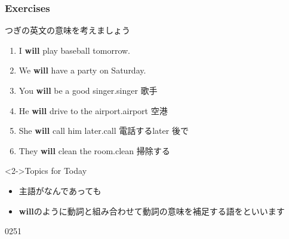 \documentclass[aspectratio=169,xcolor={dvipsnames,table}]{beamer}
\newcommand{\myaudio}[1]{\href{#1}{\faVolumeUp}}
\begin{document}
\begin{frame}[plain]\frametitle{Exercises}

{\small つぎの英文の意味を考えましょう}

\begin{enumerate}
 \item I {\bfseries will} play baseball tomorrow.
 \item We  {\bfseries will} have a party on Saturday.
 \item You {\bfseries will} be a good singer.\hfill{\scriptsize singer  歌手}
 \item He {\bfseries will} drive to the airport.\hfill{\scriptsize airport  空港}
 \item She {\bfseries will} call him later.\hfill{\scriptsize call  電話する\hspace{8pt}later  後で}
 \item They {\bfseries will} clean the room.\hfill{\scriptsize clean  掃除する}
\end{enumerate}

\vfill

\begin{block}<2->{Topics for Today}
\begin{itemize}[square]\small
 \item<2->  主語がなんであっても\,
 \item<3-> {\bfseries will}のように動詞と組み合わせて動詞の意味を補足する語をといいます
 \end{itemize}
     \end{block}

\mbox{}\hfill{\tiny 0251}\,{\scriptsize \myaudio{./audio/012_will_02.mp3}}
\end{frame}
\end{document}
